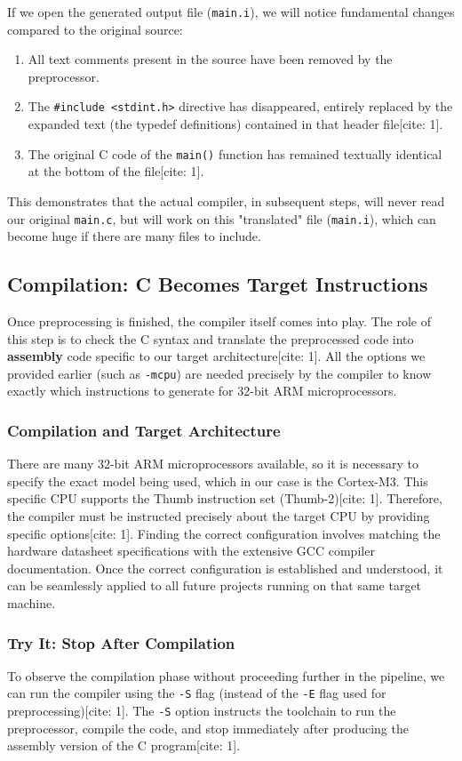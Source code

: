 If we open the generated output file (\texttt{main.i}), we will notice fundamental changes compared to the original source:
\begin{enumerate}
    \item All text comments present in the source have been removed by the preprocessor.
    \item The \texttt{\#include <stdint.h>} directive has disappeared, entirely replaced by the expanded text (the typedef definitions) contained in that header file[cite: 1].
    \item The original C code of the \texttt{main()} function has remained textually identical at the bottom of the file[cite: 1].
\end{enumerate}
This demonstrates that the actual compiler, in subsequent steps, will never read our original \texttt{main.c}, but will work on this "translated" file (\texttt{main.i}), which can become huge if there are many files to include.

\subsection{Compilation: C Becomes Target Instructions}
Once preprocessing is finished, the compiler itself comes into play. The role of this step is to check the C syntax and translate the preprocessed code into \textbf{assembly} code specific to our target architecture[cite: 1]. 
All the options we provided earlier (such as \texttt{-mcpu}) are needed precisely by the compiler to know exactly which instructions to generate for 32-bit ARM microprocessors.

\subsubsection{Compilation and Target Architecture}
There are many 32-bit ARM microprocessors available, so it is necessary to specify the exact model being used, which in our case is the Cortex-M3. This specific CPU supports the Thumb instruction set (Thumb-2)[cite: 1]. Therefore, the compiler must be instructed precisely about the target CPU by providing specific options[cite: 1]. Finding the correct configuration involves matching the hardware datasheet specifications with the extensive GCC compiler documentation. Once the correct configuration is established and understood, it can be seamlessly applied to all future projects running on that same target machine.

\subsubsection{Try It: Stop After Compilation}
To observe the compilation phase without proceeding further in the pipeline, we can run the compiler using the \texttt{-S} flag (instead of the \texttt{-E} flag used for preprocessing)[cite: 1]. The \texttt{-S} option instructs the toolchain to run the preprocessor, compile the code, and stop immediately after producing the assembly version of the C program[cite: 1].
    
